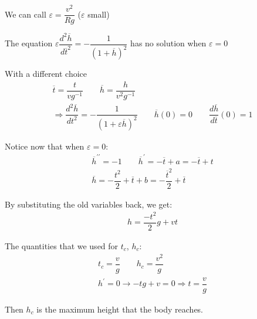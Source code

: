 \noindent We can call $\varepsilon = \dfrac{v^2}{Rg}$ ($\varepsilon$ small)
\par\bigskip
\noindent The equation $\varepsilon\dfrac{d^2\overline{h}}{d\overline{t}^2} = -\dfrac{1}{(1+\overline{h})^2}$ has no solution when $\varepsilon = 0$
\par\bigskip
\noindent With a different choice
\begin{equation*}
  \begin{gathered}
    \overline{t} = \dfrac{t}{vg^{-1}}\qquad \overline{h} = \dfrac{h}{v^2g^{-1}}\\
    \Rightarrow \dfrac{d^2\overline{h}}{dt^2} = -\dfrac{1}{(1+\varepsilon\overline{h})^2}\qquad \overline{h}(0) = 0\qquad \dfrac{d\overline{h}}{d\overline{t}}(0) = 1
  \end{gathered}
\end{equation*}\par
\noindent Notice now that when $\varepsilon=0$:
\begin{equation*}
  \begin{gathered}
    \overline{h}^{\prime\prime} = -1\qquad \overline{h}^{\prime} = -\overline{t}+a=-\overline{t}+t\\
    \overline{h} = -\dfrac{t^2}{2}+\overline{t}+b=-\dfrac{\overline{t}^2}{2}+\overline{t}
  \end{gathered}
\end{equation*}\par
\noindent By substituting the old variables back, we get:
\begin{equation*}
  \begin{gathered}
    h = \dfrac{-t^2}{2}g+vt
  \end{gathered}
\end{equation*}\par
\noindent The quantities that we used for $t_c$, $h_c$:
\begin{equation*}
  \begin{gathered}
    t_c = \dfrac{v}{g}\qquad h_c = \dfrac{v^2}{g}\\
    h^{\prime}=0\rightarrow -tg+v=0\Rightarrow t = \dfrac{v}{g}
  \end{gathered}
\end{equation*}\par
\noindent Then $h_c$ is the maximum height that the body reaches.
